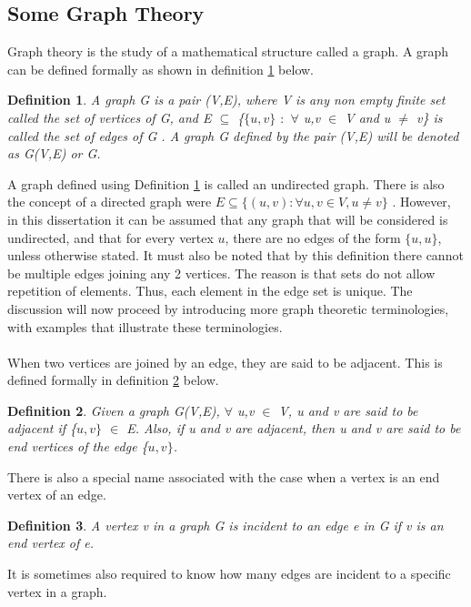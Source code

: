 \documentclass[12pt]{article}
\newtheorem{definition}{Definition}[subsection]
\numberwithin{equation}{subsection}
\numberwithin{table}{subsection}
\numberwithin{algorithm}{subsection}
\numberwithin{figure}{subsection}
\begin{document}
\subsection{Some Graph Theory}
\label{some_graph_theory}
Graph theory is the study of a mathematical structure called a graph. A graph can be defined formally as shown in definition \ref{Graph} below.
\begin{definition}
\label{Graph}
A graph G is a pair (V,E), where V is any non empty finite set called the set of vertices of G, and E $\subseteq$ \{$\{u,v\}$ $:$ $\forall$ u,v $\in$ V and u $\neq$ v\} is called the set of edges of G {}. A graph G defined by the pair (V,E) will be denoted as G(V,E) or G.
\end{definition}
A graph defined using Definition \ref{Graph} is called an undirected graph. There is also the concept of a directed graph were $\mathit{E \subseteq \{(u,v) : \forall u,v \in V, u \neq v\}}$ \cite{black_tanenbaum_2017}. However, in this dissertation it can be assumed that any graph that will be considered is undirected, and that for every vertex $u$, there are no edges of the form $\{u, u\}$, unless otherwise stated. It must also be noted that by this definition there cannot be multiple edges joining any 2 vertices. The reason is that sets do not allow repetition of elements. Thus, each element in the edge set is unique. The discussion will now proceed by introducing more graph theoretic terminologies, with examples that illustrate these terminologies.\\
\\When two vertices are joined by an edge, they are said to be adjacent. This is defined formally in definition \ref{adjacent} below.
\begin{definition}
\label{adjacent}
Given a graph G(V,E), $\forall$ u,v $\in$ V, u and v are said to be adjacent if \{$u,v\}$ $\in$ E. Also, if u and v are adjacent, then u and v are said to be end vertices of the edge \{$u,v\}$. 
\end{definition}
There is also a special name associated with the case when a vertex is an end vertex of an edge.
\begin{definition}
\label{incident}
A vertex v in a graph G is incident to an edge e in G if v is an end vertex of e. {}
\end{definition}
It is sometimes also required to know how many edges are incident to a specific vertex in a graph.
\end{document}
